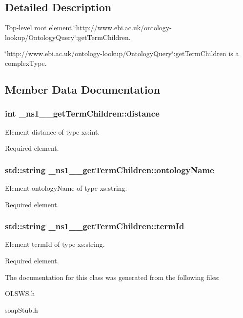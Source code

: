 \subsection{Detailed Description}
Top-\/level root element \char`\"{}http://www.ebi.ac.uk/ontology-\/lookup/OntologyQuery\char`\"{}:getTermChildren. 

\char`\"{}http://www.ebi.ac.uk/ontology-\/lookup/OntologyQuery\char`\"{}:getTermChildren is a complexType. 

\subsection{Member Data Documentation}
\hypertarget{class__ns1____getTermChildren_a0c3c54ed32733eeb833d01aa85867fd1}{
\subsubsection[{distance}]{\setlength{\rightskip}{0pt plus 5cm}int {\bf \_\-ns1\_\-\_\-getTermChildren::distance}}}
\label{class__ns1____getTermChildren_a0c3c54ed32733eeb833d01aa85867fd1}


Element distance of type xs:int. 

Required element. \hypertarget{class__ns1____getTermChildren_a3c14c7148d11af2edf3e1f5bf90c2356}{
\subsubsection[{ontologyName}]{\setlength{\rightskip}{0pt plus 5cm}std::string {\bf \_\-ns1\_\-\_\-getTermChildren::ontologyName}}}
\label{class__ns1____getTermChildren_a3c14c7148d11af2edf3e1f5bf90c2356}


Element ontologyName of type xs:string. 

Required element. \hypertarget{class__ns1____getTermChildren_a07b100ba1140aa637de26081c8ab7c91}{
\subsubsection[{termId}]{\setlength{\rightskip}{0pt plus 5cm}std::string {\bf \_\-ns1\_\-\_\-getTermChildren::termId}}}
\label{class__ns1____getTermChildren_a07b100ba1140aa637de26081c8ab7c91}


Element termId of type xs:string. 

Required element. 

The documentation for this class was generated from the following files:\begin{DoxyCompactItemize}
\item 
OLSWS.h\item 
soapStub.h\end{DoxyCompactItemize}
